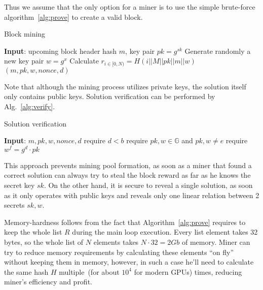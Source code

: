 Thus we assume that the only option for a miner is to use the simple brute-force algorithm~\ref{alg:prove} to
create a valid block.

\begin{algorithm}[H]
    \caption{Block mining}
    \label{alg:prove}
    \begin{algorithmic}[1]
        \State \textbf{Input}: upcoming block header hash $m$, key pair $pk=g^{sk}$
        \State Generate randomly a new key pair $w=g^x$
        \State Calculate $r_{i \in [0,N)}=H(i||M||pk||m||w)$
        \State \Return $(m,pk,w,nonce,d)$
        \EndIf
        \EndWhile
    \end{algorithmic}
\end{algorithm}

Note that although the mining process utilizes private keys, the solution itself
only contains public keys. Solution verification can be performed by Alg.~\ref{alg:verify}.

\begin{algorithm}[H]
    \caption{Solution verification}
    \label{alg:verify}
    \begin{algorithmic}[1]
        \State \textbf{Input}: $m,pk,w,nonce,d$
        \State require $d < b$
        \State require $pk,w\in \mathbb{G}$ and $pk,w \ne e$
        \State require $w^f = g^d \cdot pk$
    \end{algorithmic}
\end{algorithm}

This approach prevents mining pool formation, as soon as a miner that found a correct solution
can always try to steal the block reward as far as he knows the secret key $sk$. On the other hand,
it is secure to reveal a single solution, as soon as it only operates with public keys and reveals only one
linear relation between 2 secrets $sk, w$.

Memory-hardness follows from the fact that Algorithm~\ref{alg:prove} requires to keep
the whole list $R$ during the main loop execution.
Every list element takes 32 bytes, so the whole list of $N$ elements
takes $N \cdot 32 = 2 Gb$ of memory.
Miner can try to reduce memory requirements by calculating these elements ``on fly''
without keeping them in memory, however, in such a case he'll need to calculate the same
hash $H$ multiple~(for about $10^4$ for modern GPUs) times, reducing miner's efficiency and profit.


